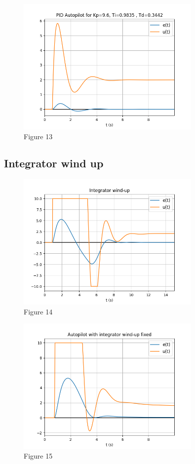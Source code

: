 \documentclass[8pt]{article}
\begin{document}
\begin{figure}[H]
    \centering
    \includegraphics[width=0.8\textwidth]{figures/FIGURE_13.png}
    \caption{Figure 13}
    \label{fig:figure13}
\end{figure}


\subsection{Integrator wind up}

\begin{figure}[H]
    \centering
    \includegraphics[width=0.8\textwidth]{figures/FIGURE_14.png}
    \caption{Figure 14}
    \label{fig:figure14}
\end{figure}

\begin{figure}[H]
    \centering
    \includegraphics[width=0.8\textwidth]{figures/FIGURE_15.png}
    \caption{Figure 15}
    \label{fig:figure15}
\end{figure}
\end{document}

